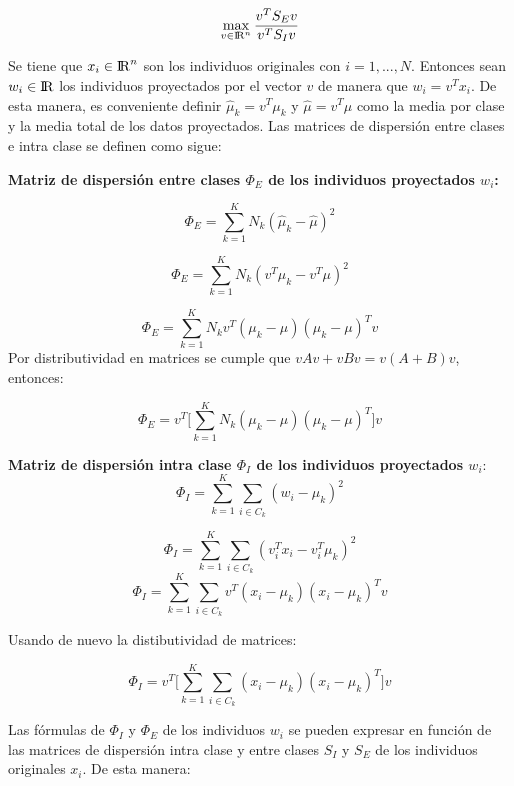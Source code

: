 \begin{equation} \label{eq:2.9}
\max_{v \in {\rm I\!R}^{n}} \frac{v^T S_E v}{v^T S_I v}  
\end{equation}

Se tiene que $x_i \in {\rm I\!R}^{n}$ son los individuos originales con $i = 1 , ... , N $. Entonces sean $w_i \in {\rm I\!R}$ los individuos proyectados por el vector $v$ de manera que $w_i = v^Tx_i$. De esta manera, es conveniente definir $\widehat{\mu}_k = v^T \mu_k$ y $\widehat{\mu} = v^T \mu$ como la media por clase y la media total de los datos proyectados. Las matrices de dispersión entre clases e intra clase se definen como sigue:

\textbf{Matriz de dispersión entre clases $\Phi_{E}$ de los individuos proyectados $w_i$:}

$$\Phi_{E} = \sum\limits_{k =1}^{K} N_k (\widehat{\mu}_k - \widehat{\mu} )^2$$

$$\Phi_{E} = \sum\limits_{k =1}^{K} N_k (v^T \mu_k - v^T \mu)^2$$

$$\Phi_{E} =  \sum\limits_{k =1}^{K} N_k v^T ( \mu_k - \mu )(\mu_k - \mu )^T v $$
Por distributividad en matrices se cumple que $vAv+vBv =  v(A+B)v$, entonces:

\begin{equation}\label{eq:2.10}
\Phi_{E} = v^T \big[ \sum\limits_{k =1}^{K} N_k ( \mu_k - \mu )(\mu_k - \mu )^T \big] v	
\end{equation}

\textbf{Matriz de dispersión intra clase $\Phi_{I}$ de los individuos proyectados $w_i$}:
$$\Phi_{I} = \sum\limits_{k = 1}^{K} \sum\limits_{i \in C_k} (w_i - \widehat{\mu}_k)^2 $$

$$\Phi_{I} = \sum\limits_{k = 1}^{K} \sum\limits_{i \in C_k} (v_i^T x_i - v_i^T \mu_k)^{2} $$
$$\Phi_{I} =  \sum\limits_{k = 1}^{K} \sum\limits_{i \in C_k} v^T( x_i - \mu_k) ( x_i - \mu_k)^T v  $$

Usando de nuevo la distibutividad de matrices:

\begin{equation}\label{eq:2.11}
\Phi_{I} = v^T \big[ \sum\limits_{k = 1}^{K} \sum\limits_{i \in C_k} ( x_i - \mu_k) ( x_i - \mu_k)^T \big] v	
\end{equation}


 Las fórmulas de $\Phi_{I}$ y $\Phi_{E}$ de los individuos $w_i$ se pueden expresar en función de las matrices de dispersión intra clase y entre clases $S_I$ y $S_E$ de los individuos originales $x_i$. De esta manera:

